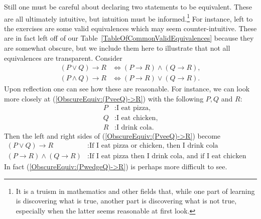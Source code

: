 Still one must be careful about declaring two statements
to be equivalent.  These are all ultimately intuitive,
but intuition must be informed.\footnote{%
It is a truism in mathematics and other fields that, while
one part of learning is discovering what is true, another part is
discovering what is not true, especially when the latter seems
reasonable at first look.%
} For instance, left to the exercises are some valid equivalences which
may seem counter-intuitive.  These are in fact left off of our 
Table~\ref{TableOfCommonValidEquivalences} because they are somewhat
obscure, but we include them here to illustrate that not all 
equivalences are transparent.  Consider
\begin{align}
(P\vee Q)\longrightarrow R&\iff(P\longrightarrow R)\wedge(Q\longrightarrow R),
   \label{ObscureEquiv:(PveeQ)->R}\\
(P\wedge Q)\longrightarrow R&\iff(P\longrightarrow R)\vee(Q\longrightarrow R).
   \label{ObscureEquiv:(PwedgeQ)->R}\end{align}
Upon reflection one can see how these are reasonable.  For instance, we
can look more closely at (\ref{ObscureEquiv:(PveeQ)->R}) with the
following $P,Q$ and $R$:
\begin{align*}
P&:\text{I eat pizza,}\\
Q&:\text{I eat chicken,}\\
R&:\text{I drink cola.}\end{align*}
Then the left and right sides of (\ref{ObscureEquiv:(PveeQ)->R})
become
\begin{align*}
(P\vee Q)\longrightarrow R&:\text{If I eat pizza or chicken, then I drink cola}
       \\
(P\longrightarrow R)\wedge(Q\longrightarrow R)&:\text{If I eat pizza
   then I drink cola, and if I eat chicken then I drink cola.}
\end{align*}
In fact (\ref{ObscureEquiv:(PwedgeQ)->R}) is perhaps more difficult
to see.  

